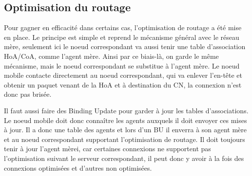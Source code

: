 \subsection{Optimisation du routage}

Pour gagner en efficacité dans certains cas, l’optimisation de routage a été mise en place.
Le principe est simple et reprend le mécanisme général avec le réseau mère, seulement ici le noeud correspondant va aussi tenir une table d’association HoA/CoA, comme l'agent mère.
Ainsi par ce biais-là, on garde le même mécanisme, mais le noeud correspondant se substitue à l'agent mère.
Le noeud mobile contacte directement au noeud correspondant, qui va enlever l’en-tête et obtenir un paquet venant de la HoA et à destination du CN, la connexion n’est donc pas brisée.


Il faut aussi faire des Binding Update pour garder à jour les tables d’associations.
Le noeud mobile doit donc connaître les agents auxquels il doit envoyer ces mises à jour.
Il a donc une table des agents et lors d’un BU il enverra à son agent mère et au noeud correspondant supportant l’optimisation de routage.
Il doit toujours tenir à jour l’agent mèrei, car certaines connexions ne supportent pas l’optimisation suivant le serveur correspondant, il peut donc y avoir à la fois des connexions optimisées et d’autres non optimisées.


